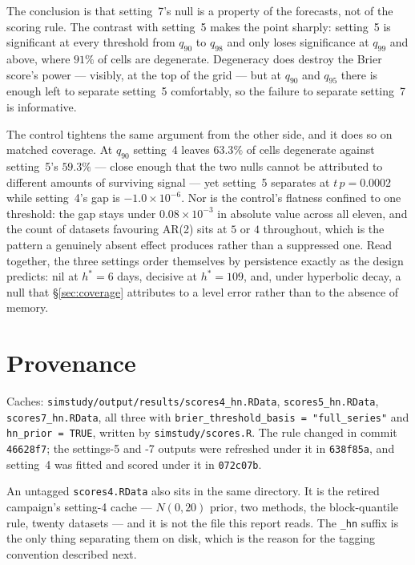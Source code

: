 \documentclass[11pt]{article}
\newcommand{\code}[1]{\texttt{#1}}
\begin{document}
The conclusion is that setting~7's null is a property of the forecasts,
not of the scoring rule. The contrast with setting~5 makes the point
sharply: setting~5 is significant at every threshold from $q_{90}$ to
$q_{98}$ and only loses significance at $q_{99}$ and above, where
$91\%$ of cells are degenerate. Degeneracy does destroy the Brier score's
power --- visibly, at the top of the grid --- but at $q_{90}$ and
$q_{95}$ there is enough left to separate setting~5 comfortably, so the
failure to separate setting~7 is informative.

The control tightens the same argument from the other side, and it does
so on matched coverage. At $q_{90}$ setting~4 leaves $63.3\%$ of cells
degenerate against setting~5's $59.3\%$ --- close enough that the two
nulls cannot be attributed to different amounts of surviving signal ---
yet setting~5 separates at $t\,p = 0.0002$ while setting~4's gap is
$-1.0 \times 10^{-6}$. Nor is the control's flatness confined to one
threshold: the gap stays under $0.08 \times 10^{-3}$ in absolute value
across all eleven, and the count of datasets favouring AR(2) sits at $5$
or $4$ throughout, which is the pattern a genuinely absent effect
produces rather than a suppressed one. Read together, the three settings
order themselves by persistence exactly as the design predicts: nil at
$h^\ast = 6$ days, decisive at $h^\ast = 109$, and, under hyperbolic
decay, a null that \S\ref{sec:coverage} attributes to a level error
rather than to the absence of memory.

\section{Provenance}

Caches: \code{simstudy/output/results/scores4\_hn.RData},
\code{scores5\_hn.RData}, \code{scores7\_hn.RData}, all three with
\code{brier\_threshold\_basis = "full\_series"} and
\code{hn\_prior = TRUE}, written by \code{simstudy/scores.R}. The rule
changed in commit \code{46628f7}; the settings-5 and -7 outputs were
refreshed under it in \code{638f85a}, and setting~4 was fitted and scored
under it in \code{072c07b}.

An untagged \code{scores4.RData} also sits in the same directory. It is
the retired campaign's setting-4 cache --- $N(0, 20)$ prior, two methods,
the block-quantile rule, twenty datasets --- and it is not the file this
report reads. The \code{\_hn} suffix is the only thing separating them on
disk, which is the reason for the tagging convention described next.
\end{document}
